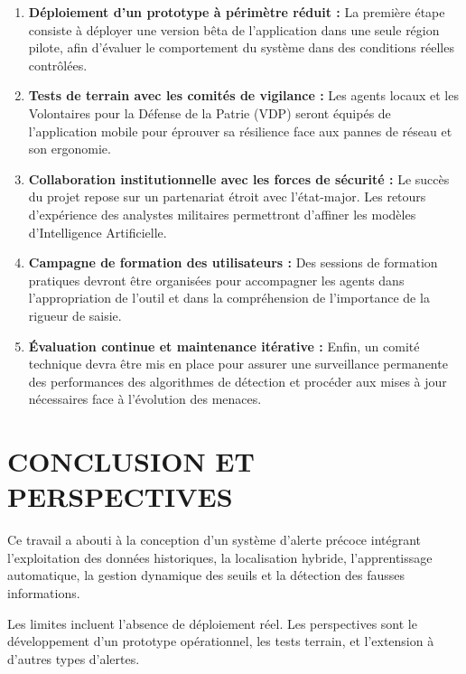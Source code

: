 \documentclass[12pt,a4paper]{article}
\begin{document}
\begin{enumerate}
    \item \textbf{Déploiement d'un prototype à périmètre réduit :} La première étape consiste à déployer une version bêta de l'application dans une seule région pilote, afin d'évaluer le comportement du système dans des conditions réelles contrôlées.
    \item \textbf{Tests de terrain avec les comités de vigilance :} Les agents locaux et les Volontaires pour la Défense de la Patrie (VDP) seront équipés de l'application mobile pour éprouver sa résilience face aux pannes de réseau et son ergonomie.
    \item \textbf{Collaboration institutionnelle avec les forces de sécurité :} Le succès du projet repose sur un partenariat étroit avec l'état-major. Les retours d'expérience des analystes militaires permettront d'affiner les modèles d'Intelligence Artificielle.
    \item \textbf{Campagne de formation des utilisateurs :} Des sessions de formation pratiques devront être organisées pour accompagner les agents dans l'appropriation de l'outil et dans la compréhension de l'importance de la rigueur de saisie.
    \item \textbf{Évaluation continue et maintenance itérative :} Enfin, un comité technique devra être mis en place pour assurer une surveillance permanente des performances des algorithmes de détection et procéder aux mises à jour nécessaires face à l'évolution des menaces.
\end{enumerate}

\newpage
\chapter*{CONCLUSION ET PERSPECTIVES}

Ce travail a abouti à la conception d’un système d’alerte précoce intégrant l’exploitation des données historiques, la localisation hybride, l’apprentissage automatique, la gestion dynamique des seuils et la détection des fausses informations.

Les limites incluent l’absence de déploiement réel. Les perspectives sont le développement d’un prototype opérationnel, les tests terrain, et l’extension à d’autres types d’alertes.
\end{document}
